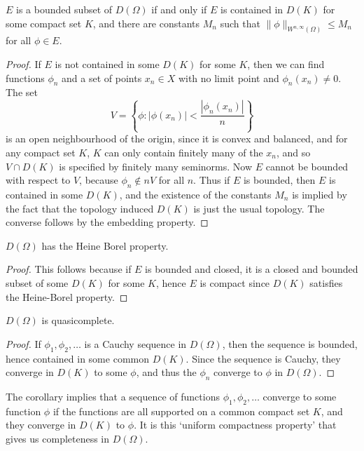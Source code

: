 \begin{theorem}
    $E$ is a bounded subset of $D(\Omega)$ if and only if $E$ is contained in $D(K)$ for some compact set $K$, and there are constants $M_n$ such that $\| \phi \|_{W^{n,\infty}(\Omega)} \leq M_n$ for all $\phi \in E$.
\end{theorem}
\begin{proof}
    If $E$ is not contained in some $D(K)$ for some $K$, then we can find functions $\phi_n$ and a set of points $x_n \in X$ with no limit point and $\phi_n(x_n) \neq 0$. The set
    \[ V = \left\{ \phi: |\phi(x_n)| < \frac{|\phi_n(x_n)|}{n} \right\} \]
    is an open neighbourhood of the origin, since it is convex and balanced, and for any compact set $K$, $K$ can only contain finitely many of the $x_n$, and so $V \cap D(K)$ is specified by finitely many seminorms. Now $E$ cannot be bounded with respect to $V$, because $\phi_n \not \in nV$ for all $n$. Thus if $E$ is bounded, then $E$ is contained in some $D(K)$, and the existence of the constants $M_n$ is implied by the fact that the topology induced $D(K)$ is just the usual topology. The converse follows by the embedding property.
\end{proof}

\begin{corollary}
    $D(\Omega)$ has the Heine Borel property.
\end{corollary}
\begin{proof}
    This follows because if $E$ is bounded and closed, it is a closed and bounded subset of some $D(K)$ for some $K$, hence $E$ is compact since $D(K)$ satisfies the Heine-Borel property.
\end{proof}

\begin{corollary}
    $D(\Omega)$ is quasicomplete.
\end{corollary}
\begin{proof}
    If $\phi_1, \phi_2, \dots$ is a Cauchy sequence in $D(\Omega)$, then the sequence is bounded, hence contained in some common $D(K)$. Since the sequence is Cauchy, they converge in $D(K)$ to some $\phi$, and thus the $\phi_n$ converge to $\phi$ in $D(\Omega)$.
\end{proof}

\begin{remark}
    The corollary implies that a sequence of functions $\phi_1, \phi_2, \dots$ converge to some function $\phi$ if the functions are all supported on a common compact set $K$, and they converge in $D(K)$ to $\phi$. It is this `uniform compactness property' that gives us completeness in $D(\Omega)$.
\end{remark}

